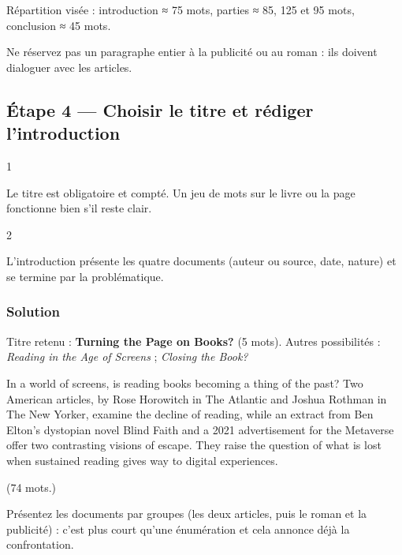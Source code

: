 \documentclass[11pt,a4paper]{article}
\begin{document}
Répartition visée : introduction ≈ 75 mots, parties ≈ 85, 125 et 95 mots, conclusion ≈ 45 mots.

\begin{piege}

Ne réservez pas un paragraphe entier à la publicité ou au roman : ils doivent dialoguer avec les articles.

\end{piege}

\hypertarget{uxe9tape-4-choisir-le-titre-et-ruxe9diger-lintroduction}{%
\subsection{Étape 4 --- Choisir le titre et rédiger l'introduction}\label{uxe9tape-4-choisir-le-titre-et-ruxe9diger-lintroduction}}

\begin{indication}{1}

Le titre est obligatoire et compté. Un jeu de mots sur le livre ou la page fonctionne bien s'il reste clair.

\end{indication}

\begin{indication}{2}

L'introduction présente les quatre documents (auteur ou source, date, nature) et se termine par la problématique.

\end{indication}

\hypertarget{solution-3}{%
\subsubsection{Solution}\label{solution-3}}

Titre retenu : \textbf{Turning the Page on Books?} (5 mots). Autres possibilités : \emph{Reading in the Age of Screens} ; \emph{Closing the Book?}

In a world of screens, is reading books becoming a thing of the past? Two American articles, by Rose Horowitch in The Atlantic and Joshua Rothman in The New Yorker, examine the decline of reading, while an extract from Ben Elton's dystopian novel Blind Faith and a 2021 advertisement for the Metaverse offer two contrasting visions of escape. They raise the question of what is lost when sustained reading gives way to digital experiences.

(74 mots.)

\begin{methode}

Présentez les documents par groupes (les deux articles, puis le roman et la publicité) : c'est plus court qu'une énumération et cela annonce déjà la confrontation.

\end{methode}
\end{document}
